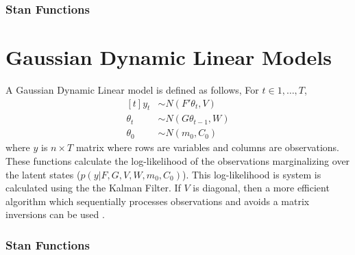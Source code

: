 

\subsubsection{Stan Functions}

\begin{description}
%
%
\end{description}
%
\begin{description}
\end{description}


\section{Gaussian Dynamic Linear Models}
\label{sec:guass-dynam-line}

A Gaussian Dynamic Linear model is defined as follows,
For $t \in 1, \dots, T$,
\[
  \begin{aligned}[t]
    y_{t} &\sim N(F' \theta_{t}, V) \\
    \theta_{t} &\sim N(G \theta_{t - 1}, W) \\
    \theta_{0} &\sim N(m_{0}, C_{0}) 
  \end{aligned}
\]
where $y$ is $n \times T$ matrix where rows are variables and columns
are observations. These functions calculate the log-likelihood of the
observations marginalizing over the latent states ($p(y | F, G, V, W,
m_{0}, C_{0})$).  This log-likelihood is system is calculated using
the the Kalman Filter.  If $V$ is diagonal, then a more efficient
algorithm which sequentially processes observations and avoids a
matrix inversions can be used \citep[Sec~6.4]{DurbinKoopman:2001}.


\subsubsection{Stan Functions}

